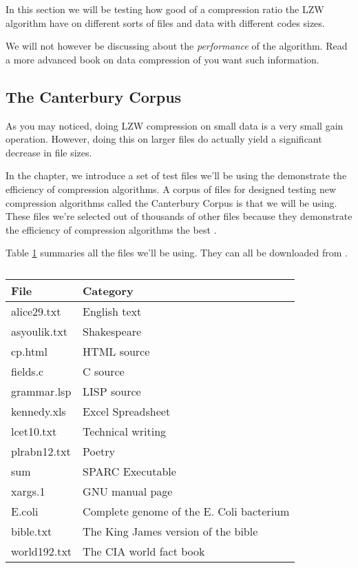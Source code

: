 \begin{refsection}
In this section we will be testing how good of a compression ratio the
LZW algorithm have on different sorts of files and data with
different codes sizes.

We will not however be discussing about the \textit{performance} of
the algorithm. Read a more advanced book on data compression of you
want such information.

\subsection{The Canterbury Corpus}

As you may noticed, doing LZW compression on small data is a very small
gain operation. However, doing this on larger files do actually yield a
significant decrease in file sizes.

In the chapter, we introduce a set of test files we'll be using the
demonstrate the efficiency of compression algorithms. A corpus of
files for designed testing new compression algorithms called the
Canterbury Corpus is that we will be using. These files we're selected
out of thousands of other files because they demonstrate the
efficiency of compression algorithms the best \cite{arnold:corpus}.

Table \ref{tab:corp-files} summaries all the files we'll be using. They can all be
downloaded from \cite{powell:desc-corp}.

\begin{table}
  \centering
  \begin{tabular}{ll}
    \toprule
    File & Category \\
    \midrule
    alice29.txt & English text \\
    asyoulik.txt & Shakespeare \\
    cp.html & HTML source \\
    fields.c & C source \\
    grammar.lsp & LISP source \\
    kennedy.xls & Excel Spreadsheet \\
    lcet10.txt & Technical writing \\
    plrabn12.txt & Poetry \\
    sum & SPARC Executable \\
    xargs.1 & GNU manual page \\
    E.coli & Complete genome of the E. Coli bacterium \\
    bible.txt & The King James version of the bible \\
    world192.txt & The CIA world fact book \\
    \bottomrule
  \end{tabular}
  \caption{}
  \label{tab:corp-files}
\end{table}


\end{refsection}
